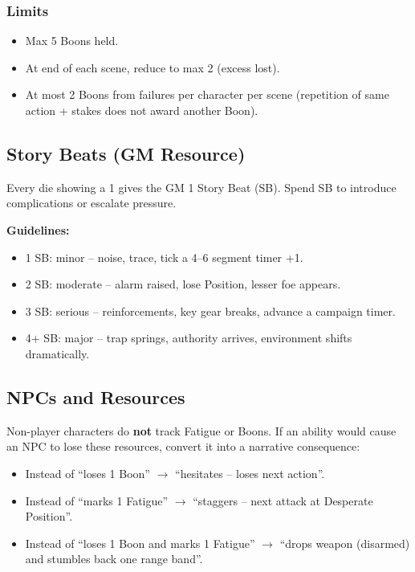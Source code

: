 \subsubsection{Limits}
\begin{itemize}
  \item Max 5 Boons held.
  \item At end of each scene, reduce to max 2 (excess lost).
  \item At most 2 Boons from failures per character per scene (repetition of same action + stakes does not award another Boon).
\end{itemize}

\subsection{Story Beats (GM Resource)}

Every die showing a 1 gives the GM 1 Story Beat (SB). Spend SB to introduce complications or escalate pressure.

\textbf{Guidelines:}
\begin{itemize}
  \item 1 SB: minor -- noise, trace, tick a 4--6 segment timer +1.
  \item 2 SB: moderate -- alarm raised, lose Position, lesser foe appears.
  \item 3 SB: serious -- reinforcements, key gear breaks, advance a campaign timer.
  \item 4+ SB: major -- trap springs, authority arrives, environment shifts dramatically.
\end{itemize}

\subsection{NPCs and Resources}

Non-player characters do \textbf{not} track Fatigue or Boons. If an ability would cause an NPC to lose these resources, convert it into a narrative consequence:

\begin{itemize}
  \item Instead of ``loses 1 Boon'' $\rightarrow$ ``hesitates -- loses next action''.
  \item Instead of ``marks 1 Fatigue'' $\rightarrow$ ``staggers -- next attack at Desperate Position''.
  \item Instead of ``loses 1 Boon and marks 1 Fatigue'' $\rightarrow$ ``drops weapon (disarmed) and stumbles back one range band''.
\end{itemize}

